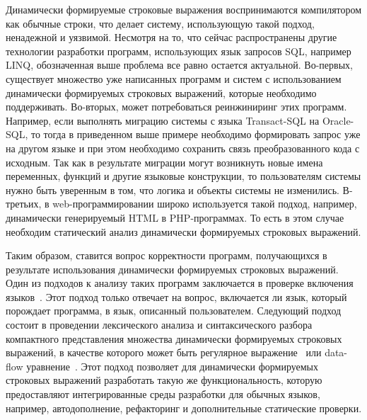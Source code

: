 Динамически формируемые строковые выражения воспринимаются компилятором как обычные строки, что делает систему, использующую такой подход, ненадежной и уязвимой. Несмотря на то, что сейчас распространены другие технологии разработки программ, использующих язык запросов SQL, например LINQ, обозначенная выше проблема все равно остается актуальной. Во-первых, существует множество  уже написанных программ и систем с использованием динамически формируемых строковых выражений, которые необходимо поддерживать. Во-вторых, может потребоваться реинжиниринг этих программ. Например, если выполнять миграцию системы с языка Transact-SQL на Oracle-SQL, то тогда в приведенном выше примере необходимо формировать запрос уже на другом языке и при этом необходимо сохранить связь преобразованного кода с исходным. Так как в результате миграции  могут возникнуть новые имена переменных, функций и другие языковые конструкции, то пользователям системы нужно быть уверенным в том, что логика и объекты системы не изменились. В-третьих, в web-программировании широко используется такой подход, например, динамически генерируемый HTML в PHP-программах. То есть в этом случае необходим статический анализ динамически формируемых строковых выражений.    

Таким образом, ставится вопрос корректности программ, получающихся в результате использования динамически формируемых строковых выражений. Один из подходов к анализу таких программ заключается в проверке включения языков~\cite{JSA1, PHPSA}. Этот подход только отвечает на вопрос, включается ли язык, который порождает программа, в язык, описанный пользователем. Следующий подход состоит в проведении лексического анализа и синтаксического разбора компактного представления множества динамически формируемых строковых выражений, в качестве которого может быть регулярное выражение~\cite{Alvor1} или data-flow уравнение~\cite{Doh}. Этот подход позволяет для динамически формируемых строковых выражений разработать такую же функциональность, которую предоставляют интегрированные среды разработки для обычных языков, например, автодополнение, рефакторинг и дополнительные статические проверки.

